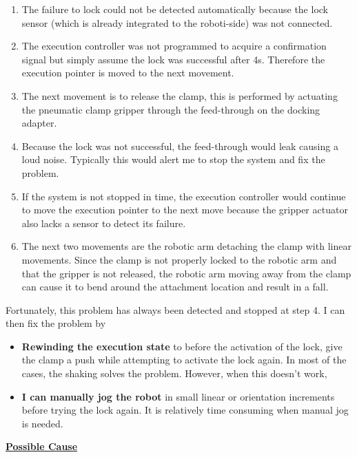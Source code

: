 \begin{enumerate}
	\item The failure to lock could not be detected automatically because the lock sensor (which is already integrated to the roboti-side) was not connected.

	\item The execution controller was not programmed to acquire a confirmation signal but simply assume the lock was successful after 4s. Therefore the execution pointer is moved to the next movement.

	\item The next movement is to release the clamp, this is performed by actuating the pneumatic clamp gripper through the feed-through on the docking adapter.

	\item Because the lock was not successful, the feed-through would leak causing a loud noise. Typically this would alert me to stop the system and fix the problem.

	\item If the system is not stopped in time, the execution controller would continue to move the execution pointer to the next move because the gripper actuator also lacks a sensor to detect its failure.

	\item The next two movements are the robotic arm detaching the clamp with linear movements. Since the clamp is not properly locked to the robotic arm and that the gripper is not released, the robotic arm moving away from the clamp can cause it to bend around the attachment location and result in a fall. 

\end{enumerate}
Fortunately, this problem has always been detected and stopped at step 4. I can then fix the problem by 

\begin{itemize}
	\item \textbf{Rewinding the execution state }to before the activation of the lock, give the clamp a push while attempting to activate the lock again. In most of the cases, the shaking solves the problem. However, when this doesn’t work,

	\item \textbf{I can manually jog the robot} in small linear or orientation increments before trying the lock again. It is relatively time consuming when manual jog is needed.

\end{itemize}
\textbf{\uline{Possible Cause}}

